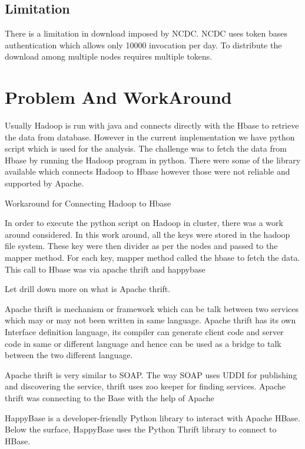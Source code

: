 \documentclass[9pt,twocolumn,twoside]{../../styles/osajnl}
\begin{document}
\subsection{Limitation}
There is a limitation in download imposed by NCDC. NCDC uses token bases authentication which allows only 10000 invocation per day. To distribute the download among multiple nodes requires multiple tokens.

\section{Problem And WorkAround}

Usually Hadoop is run with java and connects directly with the Hbase to retrieve the data from database.
However in the current implementation we have python script which is used for the analysis. The challenge was to fetch the data from Hbase by running the Hadoop program in python. 
There were some of the library available which connects Hadoop to Hbase  however those were not reliable and supported by Apache. 

Workaround for Connecting Hadoop to Hbase

In order to execute the python script on Hadoop in cluster, there was a work around considered. 
In this work around, all the keys were stored in the hadoop file system. These key were then divider as per the nodes and passed to the mapper method. 
For each key, mapper method called the hbase to fetch the data.  This call to Hbase was via apache thrift and happybase

Let drill down more on what is Apache thrift. 

Apache thrift is mechanism or framework which can be talk between two services which may or may not been written in same language. Apache thrift has its own 
Interface definition language, its compiler can generate client code and server code in same or different language and hence can be used as a bridge to talk between the two different language.

Apache thrift is very similar to SOAP. The way SOAP uses UDDI for publishing and discovering the service, thrift uses zoo keeper for finding services.
Apache thrift was connecting to the Base with the help of Apache 


HappyBase is a developer-friendly Python library to interact with Apache HBase. 
Below the surface, HappyBase uses the Python Thrift library to connect to HBase.    
\end{document}
